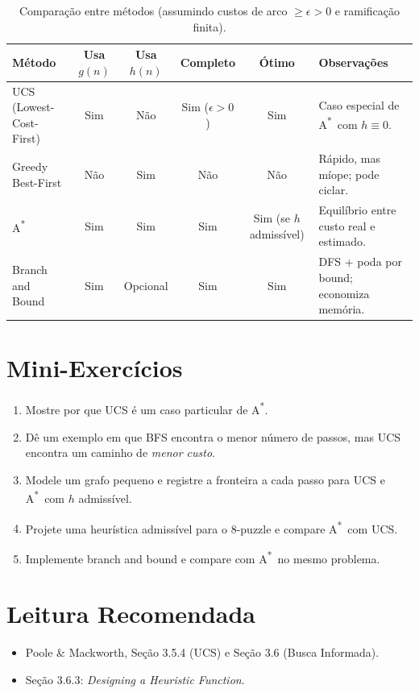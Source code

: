 \documentclass[9pt,a4paper]{extarticle}
\newcommand{\Astar}{A\textsuperscript{*}}
\begin{document}
\begin{table}[H]
\centering
\small
\setlength{\tabcolsep}{4pt}
\renewcommand{\arraystretch}{1.2}
\begin{tabular}{@{}lccccp{5.2cm}@{}}
\toprule
\textbf{Método} & \textbf{Usa $g(n)$} & \textbf{Usa $h(n)$} & \textbf{Completo} & \textbf{Ótimo} & \textbf{Observações} \\
\midrule
UCS (Lowest-Cost-First) & Sim & Não & Sim ($\epsilon>0$) & Sim & Caso especial de \Astar\ com $h\equiv 0$. \\
Greedy Best-First       & Não & Sim & Não               & Não & Rápido, mas míope; pode ciclar. \\
\Astar                  & Sim & Sim & Sim               & Sim (se $h$ admissível) & Equilíbrio entre custo real e estimado. \\
Branch and Bound        & Sim & Opcional & Sim         & Sim & DFS + poda por bound; economiza memória. \\
\bottomrule
\end{tabular}
\caption{Comparação entre métodos (assumindo custos de arco $\ge \epsilon>0$ e ramificação finita).}
\end{table}

\section*{Mini-Exercícios}

\begin{enumerate}
  \item Mostre por que UCS é um caso particular de \Astar.
  \item Dê um exemplo em que BFS encontra o menor número de passos, mas UCS encontra um caminho de \emph{menor custo}.
  \item Modele um grafo pequeno e registre a fronteira a cada passo para UCS e \Astar\ com $h$ admissível.
  \item Projete uma heurística admissível para o 8-puzzle e compare \Astar\ com UCS.
  \item Implemente branch and bound e compare com \Astar\ no mesmo problema.
\end{enumerate}

\section*{Leitura Recomendada}
\begin{itemize}
  \item Poole \& Mackworth, Seção 3.5.4 (UCS) e Seção 3.6 (Busca Informada).
  \item Seção 3.6.3: \textit{Designing a Heuristic Function}.
\end{itemize}
\end{document}

